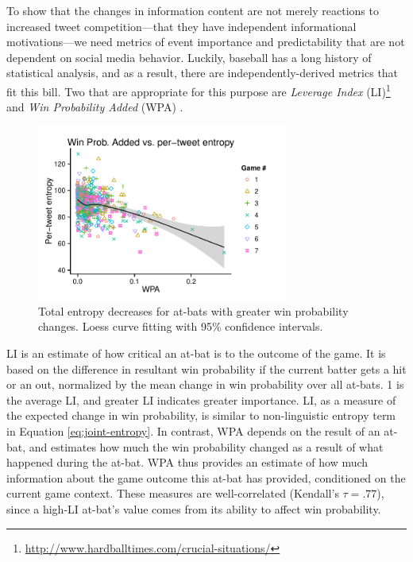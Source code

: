 \documentclass[11pt,letterpaper]{article}
\begin{document}
To show that the changes in information content are not merely reactions to increased tweet competition---that they have independent informational motivations---we need metrics of event importance and predictability that are not dependent on social media behavior.  Luckily, baseball has a long history of statistical analysis, and as a result, there are independently-derived metrics that fit this bill.  Two that are appropriate for this purpose are {\it Leverage Index} (LI)\footnote{\url{http://www.hardballtimes.com/crucial-situations/}} and  {\it Win Probability Added} (WPA) \cite{tango2007}.


\begin{figure}
 \centering
  \includegraphics[width=3.25in]{figures/fig3.pdf}
 \caption{Total entropy decreases for at-bats with greater win probability changes. Loess curve fitting with 95\% confidence intervals.}\label{fig:wpa-tent-agg}\vspace*{-.5em}
\end{figure}


LI is an estimate of how critical an at-bat is to the outcome of the game.  It is based on the difference in resultant win probability if the current batter gets a hit or an out, normalized by the mean change in win probability over all at-bats. 1 is the average LI, and greater LI indicates greater importance.  LI, as a measure of the expected change in win probability, is similar to non-linguistic entropy term in Equation \ref{eq:joint-entropy}.  In contrast, WPA depends on the result of an at-bat, and estimates how much the win probability changed as a result of what happened during the at-bat.  WPA thus provides an estimate of how much information about the game outcome this at-bat has provided, conditioned on the current game context.  These measures are well-correlated (Kendall's $\tau=.77$), since a high-LI at-bat's value comes from its ability to affect win probability.
\end{document}
